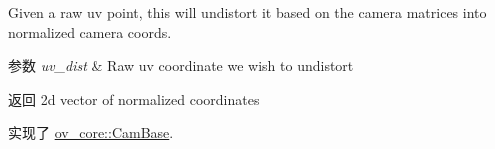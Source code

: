 Given a raw uv point, this will undistort it based on the camera matrices into normalized camera coords. 


\begin{DoxyParams}{参数}
{\em uv\+\_\+dist} & Raw uv coordinate we wish to undistort \\
\hline
\end{DoxyParams}
\begin{DoxyReturn}{返回}
2d vector of normalized coordinates 
\end{DoxyReturn}


实现了 \hyperlink{classov__core_1_1CamBase_ad0db03f97e5a12f5ad757f72e60f50e4}{ov\+\_\+core\+::\+Cam\+Base}.

